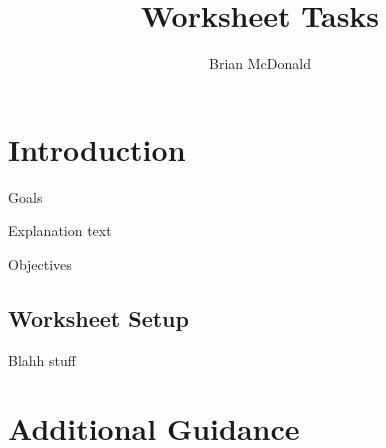 \documentclass{../../fal_assignment}
\title{Worksheet Tasks}
\author{Brian McDonald} %
\begin{document}

\section*{Introduction}


Goals

Explanation text

Objectives


\subsection*{Worksheet Setup}

Blahh stuff

\section*{Additional Guidance}
\end{document}
